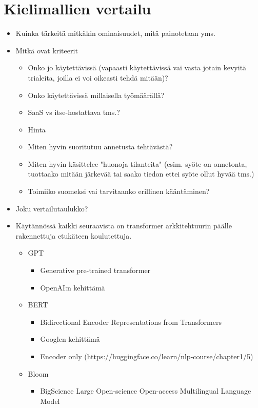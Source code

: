 \chapter{Kielimallien vertailu}%
\label{ch:vertailu}

\begin{itemize}
  \item Kuinka tärkeitä mitkäkin ominaisuudet, mitä painotetaan yms.
  \item Mitkä ovat kriteerit
  \begin{itemize}
    \item Onko jo käytettävissä (vapaasti käytettävissä vai vasta jotain kevyitä trialeita, joilla ei voi oikeasti tehdä mitään)?
    \item Onko käytettävissä millaisella työmäärällä?
    \item SaaS vs itse-hostattava tms.?
    \item Hinta
    \item Miten hyvin suoritutuu annetusta tehtävästä?
    \item Miten hyvin käsittelee "huonoja tilanteita" (esim. syöte on onnetonta, tuottaako mitään järkevää tai saako tiedon ettei syöte ollut hyvää tms.)
    \item Toimiiko suomeksi vai tarvitaanko erillinen kääntäminen?
  \end{itemize}
  \item Joku vertailutaulukko?
  \item  Käytännössä kaikki seuraavista on transformer arkkitehtuurin päälle rakennettuja etukäteen koulutettuja.
  \begin{itemize}
    \item GPT
    \begin{itemize}
      \item Generative pre-trained transformer
      \item OpenAI:n kehittämä
    \end{itemize}
    \item BERT
    \begin{itemize}
      \item Bidirectional Encoder Representations from Transformers
      \item Googlen kehittämä
      \item Encoder only (https://huggingface.co/learn/nlp-course/chapter1/5)
    \end{itemize}
    \item Bloom
    \begin{itemize}
      \item BigScience Large Open-science Open-access Multilingual Language Model

\end{itemize}
\end{itemize}
\end{itemize}
